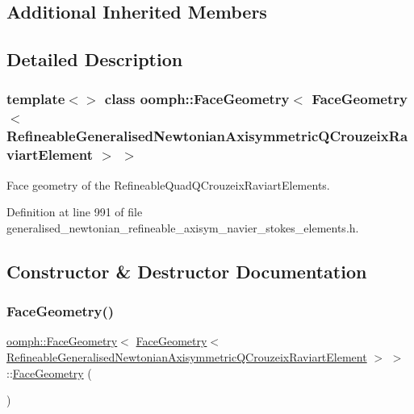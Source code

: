 \subsection*{Additional Inherited Members}


\subsection{Detailed Description}
\subsubsection*{template$<$$>$\newline
class oomph\+::\+Face\+Geometry$<$ Face\+Geometry$<$ Refineable\+Generalised\+Newtonian\+Axisymmetric\+Q\+Crouzeix\+Raviart\+Element $>$ $>$}

Face geometry of the Refineable\+Quad\+Q\+Crouzeix\+Raviart\+Elements. 

Definition at line 991 of file generalised\+\_\+newtonian\+\_\+refineable\+\_\+axisym\+\_\+navier\+\_\+stokes\+\_\+elements.\+h.



\subsection{Constructor \& Destructor Documentation}
\mbox{\label{classoomph_1_1FaceGeometry_3_01FaceGeometry_3_01RefineableGeneralisedNewtonianAxisymmetricQCrouzeixRaviartElement_01_4_01_4_af8eb7eed4de0f464ba33c2b9812d4052}} 
\subsubsection{\texorpdfstring{Face\+Geometry()}{FaceGeometry()}}
{\footnotesize\ttfamily \hyperlink{classoomph_1_1FaceGeometry}{oomph\+::\+Face\+Geometry}$<$ \hyperlink{classoomph_1_1FaceGeometry}{Face\+Geometry}$<$ \hyperlink{classoomph_1_1RefineableGeneralisedNewtonianAxisymmetricQCrouzeixRaviartElement}{Refineable\+Generalised\+Newtonian\+Axisymmetric\+Q\+Crouzeix\+Raviart\+Element} $>$ $>$\+::\hyperlink{classoomph_1_1FaceGeometry}{Face\+Geometry} (\begin{DoxyParamCaption}{ }\end{DoxyParamCaption})\hspace{0.3cm}{\ttfamily [inline]}}



